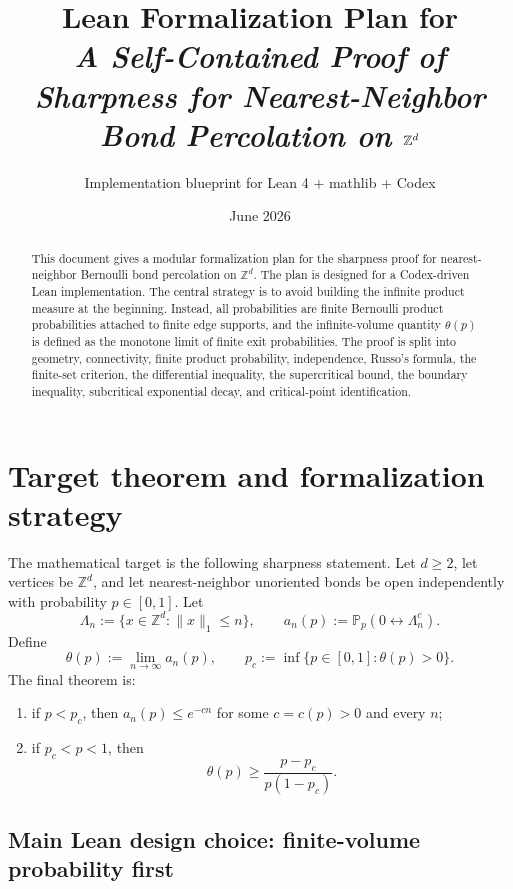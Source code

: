 \documentclass[11pt]{article}
\title{Lean Formalization Plan for\\
\emph{A Self-Contained Proof of Sharpness for Nearest-Neighbor Bond Percolation on $\Z^d$}}
\author{Implementation blueprint for Lean 4 + mathlib + Codex}
\date{June 2026}
\newcommand{\Z}{\mathbb Z}
\newcommand{\PP}{\mathbb P}
\newcommand{\conn}{\longleftrightarrow}
\newcommand{\pcrit}{p_c}
\newcommand{\Lam}{\Lambda}
\theoremstyle{definition}
\theoremstyle{plain}
\begin{document}
\maketitle

\begin{abstract}
This document gives a modular formalization plan for the sharpness proof for nearest-neighbor Bernoulli bond percolation on $\Z^d$.  The plan is designed for a Codex-driven Lean implementation.  The central strategy is to avoid building the infinite product measure at the beginning.  Instead, all probabilities are finite Bernoulli product probabilities attached to finite edge supports, and the infinite-volume quantity $\theta(p)$ is defined as the monotone limit of finite exit probabilities.  The proof is split into geometry, connectivity, finite product probability, independence, Russo's formula, the finite-set criterion, the differential inequality, the supercritical bound, the boundary inequality, subcritical exponential decay, and critical-point identification.
\end{abstract}

\tableofcontents

\section{Target theorem and formalization strategy}

The mathematical target is the following sharpness statement.  Let $d\ge 2$, let vertices be $\Z^d$, and let nearest-neighbor unoriented bonds be open independently with probability $p\in[0,1]$.  Let
\[
  \Lam_n := \{x\in\Z^d : \|x\|_1\le n\},
  \qquad
  a_n(p) := \PP_p(0\conn \Lam_n^c).
\]
Define
\[
  \theta(p) := \lim_{n\to\infty} a_n(p),
  \qquad
  \pcrit := \inf\{p\in[0,1] : \theta(p)>0\}.
\]
The final theorem is:
\begin{enumerate}[label=(\roman*)]
  \item if $p<\pcrit$, then $a_n(p)\le e^{-c n}$ for some $c=c(p)>0$ and every $n$;
  \item if $\pcrit<p<1$, then
  \[
    \theta(p) \ge \frac{p-\pcrit}{p(1-\pcrit)}.
  \]
\end{enumerate}

\subsection{Main Lean design choice: finite-volume probability first}
\end{document}
